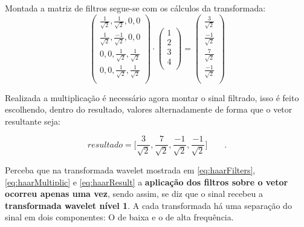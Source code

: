 \begin{myenv}{1.5}
				\par Montada a matriz de filtros segue-se com os cálculos da transformada:
				\begin{equation}
					\begin{pmatrix}
						\frac{1}{\sqrt{2}}, \frac{1}{\sqrt{2}}, 0, 0\\
						\frac{1}{\sqrt{2}}, \frac{-1}{\sqrt{2}}, 0, 0\\
						0, 0, \frac{1}{\sqrt{2}}, \frac{1}{\sqrt{2}}\\
						0, 0, \frac{1}{\sqrt{2}}, \frac{1}{\sqrt{2}}\\
					\end{pmatrix} 
					\cdot
					\begin{pmatrix}
						1\\
						2\\
						3\\
						4\\
					\end{pmatrix} 
					=
					\begin{pmatrix}
						\frac{3}{\sqrt{2}}\\
						\frac{-1}{\sqrt{2}}\\
						\frac{7}{\sqrt{2}}\\
						\frac{-1}{\sqrt{2}}\\
					\end{pmatrix}
					\label{eq:haarMultiplic}
				\end{equation}
				
				\par Realizada a multiplicação é necessário agora montar o sinal filtrado, isso é feito escolhendo, dentro do resultado, valores alternadamente de forma que o vetor resultante seja:
	
				\begin{equation}
					resultado = \Big[
					\frac{3}{\sqrt{2}},
					\frac{7}{\sqrt{2}},
					\frac{-1}{\sqrt{2}},
					\frac{-1}{\sqrt{2}}
					\Big]\qquad.
					\label{eq:haarResult}
				\end{equation}
				
				\par Perceba que na transformada wavelet mostrada em \ref{eq:haarFilters}, \ref{eq:haarMultiplic} e \ref{eq:haarResult} a \textbf{aplicação dos filtros sobre  o vetor ocorreu apenas uma vez}, sendo assim, se diz que o sinal recebeu a \textbf{transformada wavelet nível 1}. A cada transformada há uma separação do sinal em dois componentes: O de baixa e o de alta frequência.
				

\end{myenv}
